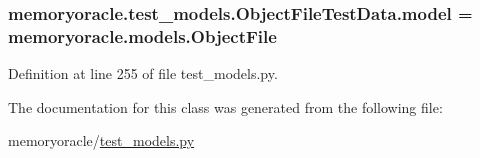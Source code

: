 \subsubsection[{model}]{\setlength{\rightskip}{0pt plus 5cm}memoryoracle.\+test\+\_\+models.\+Object\+File\+Test\+Data.\+model = {\bf memoryoracle.\+models.\+Object\+File}\hspace{0.3cm}{\ttfamily [static]}}\label{classmemoryoracle_1_1test__models_1_1ObjectFileTestData_ab61a7fbd6465c4e2d803c81199ab677b}


Definition at line 255 of file test\+\_\+models.\+py.



The documentation for this class was generated from the following file\+:\begin{DoxyCompactItemize}
\item 
memoryoracle/\hyperlink{test__models_8py}{test\+\_\+models.\+py}\end{DoxyCompactItemize}
